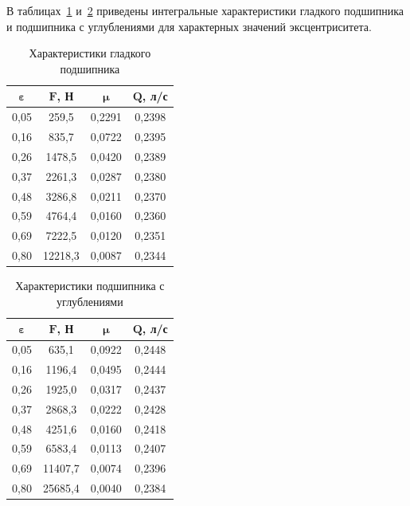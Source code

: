 В таблицах~\ref{tab:smooth_results} и~\ref{tab:textured_results} приведены интегральные характеристики гладкого подшипника и подшипника с \varDimpleTypeGenitive{} углублениями для характерных значений эксцентриситета.

\begin{table}[H]
\small
\centering
\caption{Характеристики гладкого подшипника}
\label{tab:smooth_results}
\begin{tabular}{|c|c|c|c|}
\hline
$\boldsymbol{\varepsilon}$ & $\boldsymbol{F}$\textbf{, Н} & $\boldsymbol{\mu}$ & $\boldsymbol{Q}$\textbf{, л/с} \\
\hline
0{,}05 & 259{,}5 & 0{,}2291 & 0{,}2398 \\
\hline
0{,}16 & 835{,}7 & 0{,}0722 & 0{,}2395 \\
\hline
0{,}26 & 1478{,}5 & 0{,}0420 & 0{,}2389 \\
\hline
0{,}37 & 2261{,}3 & 0{,}0287 & 0{,}2380 \\
\hline
0{,}48 & 3286{,}8 & 0{,}0211 & 0{,}2370 \\
\hline
0{,}59 & 4764{,}4 & 0{,}0160 & 0{,}2360 \\
\hline
0{,}69 & 7222{,}5 & 0{,}0120 & 0{,}2351 \\
\hline
0{,}80 & 12218{,}3 & 0{,}0087 & 0{,}2344 \\
\hline
\end{tabular}
\end{table}

\begin{table}[H]
\small
\centering
\caption{Характеристики подшипника с \varDimpleTypeGenitive{} углублениями}
\label{tab:textured_results}
\begin{tabular}{|c|c|c|c|}
\hline
$\boldsymbol{\varepsilon}$ & $\boldsymbol{F}$\textbf{, Н} & $\boldsymbol{\mu}$ & $\boldsymbol{Q}$\textbf{, л/с} \\
\hline
0{,}05 & 635{,}1 & 0{,}0922 & 0{,}2448 \\
\hline
0{,}16 & 1196{,}4 & 0{,}0495 & 0{,}2444 \\
\hline
0{,}26 & 1925{,}0 & 0{,}0317 & 0{,}2437 \\
\hline
0{,}37 & 2868{,}3 & 0{,}0222 & 0{,}2428 \\
\hline
0{,}48 & 4251{,}6 & 0{,}0160 & 0{,}2418 \\
\hline
0{,}59 & 6583{,}4 & 0{,}0113 & 0{,}2407 \\
\hline
0{,}69 & 11407{,}7 & 0{,}0074 & 0{,}2396 \\
\hline
0{,}80 & 25685{,}4 & 0{,}0040 & 0{,}2384 \\
\hline
\end{tabular}
\end{table}


